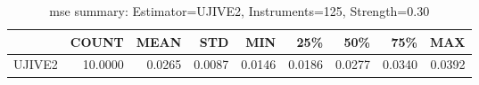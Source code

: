 \begin{table}[ht]
\centering
\caption{mse summary: Estimator=UJIVE2, Instruments=125, Strength=0.30}
\begin{tabular}{lrrrrrrrr}
\toprule
 & COUNT & MEAN & STD & MIN & 25\% & 50\% & 75\% & MAX \\
\midrule
UJIVE2 & 10.0000 & 0.0265 & 0.0087 & 0.0146 & 0.0186 & 0.0277 & 0.0340 & 0.0392 \\
\bottomrule
\end{tabular}
\end{table}
